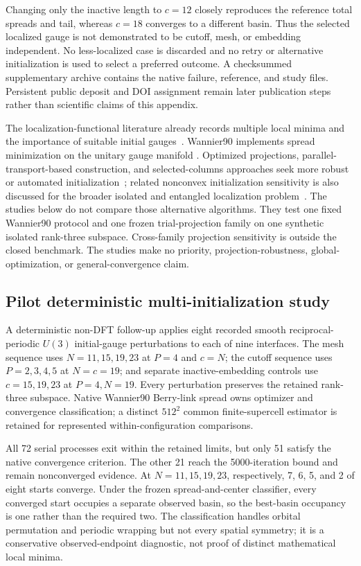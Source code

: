 Changing only the inactive length to $c=12$ closely reproduces the reference
total spreads and tail, whereas $c=18$ converges to a different basin. Thus the
selected localized gauge is not demonstrated to be cutoff, mesh, or
embedding independent. No less-localized case is discarded and no retry or
alternative initialization is used to select a preferred outcome. A
checksummed supplementary archive contains the native failure, reference, and
study files. Persistent public deposit and DOI assignment remain later
publication steps rather than scientific claims of this appendix.

The localization-functional literature already records multiple local minima
and the importance of suitable initial gauges~\cite{marzari2012}. Wannier90
implements spread minimization on the unitary gauge manifold
\cite{mostofi2008,pizzi2020}. Optimized projections, parallel-transport-based
construction, and selected-columns approaches seek more robust or automated
initialization~\cite{mustafa2015,cances2017,vitale2020}; related nonconvex
initialization sensitivity is also discussed for the broader isolated and
entangled localization problem~\cite{damle2018}. The studies below do not
compare those alternative algorithms. They test one fixed Wannier90 protocol
and one frozen trial-projection family on one synthetic isolated rank-three
subspace. Cross-family projection sensitivity is outside the closed benchmark.
The studies make no priority, projection-robustness, global-optimization, or
general-convergence claim.

\subsection{Pilot deterministic multi-initialization study}

A deterministic non-DFT follow-up applies eight recorded smooth
reciprocal-periodic $U(3)$ initial-gauge perturbations to each
of nine interfaces. The mesh sequence uses $N=11,15,19,23$ at $P=4$ and
$c=N$; the cutoff sequence uses $P=2,3,4,5$ at $N=c=19$; and separate
inactive-embedding controls use $c=15,19,23$ at $P=4,N=19$. Every
perturbation preserves the retained rank-three subspace. Native Wannier90
Berry-link spread owns optimizer and convergence classification; a distinct
$512^2$ common finite-supercell estimator is retained for represented
within-configuration comparisons.

All 72 serial processes exit within the retained limits, but only 51 satisfy
the native convergence criterion. The other 21 reach the 5000-iteration bound
and remain nonconverged evidence. At $N=11,15,19,23$, respectively, 7, 6, 5,
and 2 of eight starts converge. Under the frozen spread-and-center classifier,
every converged start occupies a separate observed basin, so the best-basin
occupancy is one rather than the required two. The classification handles
orbital permutation and periodic wrapping but not every spatial symmetry; it is
a conservative observed-endpoint diagnostic, not proof of distinct
mathematical local minima.

